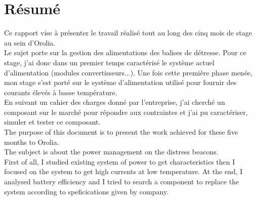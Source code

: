 \chapter{Résumé}

      Ce rapport vise à présenter le travail réalisé tout au long des cinq mois de stage au sein d'Orolia.\\ Le sujet porte sur la gestion des alimentations des balises de détresse. Pour ce stage, j'ai donc dans un premier temps caractérisé le système actuel d'alimentation (modules convertisseurs...). Une fois cette première phase menée, mon stage s'est porté sur le système d'alimentation utilisé pour fournir des courants élevés à basse température.\\  
      En suivant un cahier des charges donné par l'entreprise, j'ai cherché un composant sur le marché pour répondre aux contraintes et j'ai pu caractériser, simuler et tester ce composant.\\
      
       
    
    The purpose of this document is to present the work achieved for these five months to Orolia.\\
    The subject is about the power management on the distress beacons.\\ First of all, I studied existing system of power to get characteristics then I focused on the system to get high currents at low temperature. At the end, I analysed battery efficiency and I tried to search a component to replace the system according to speficications given by company.